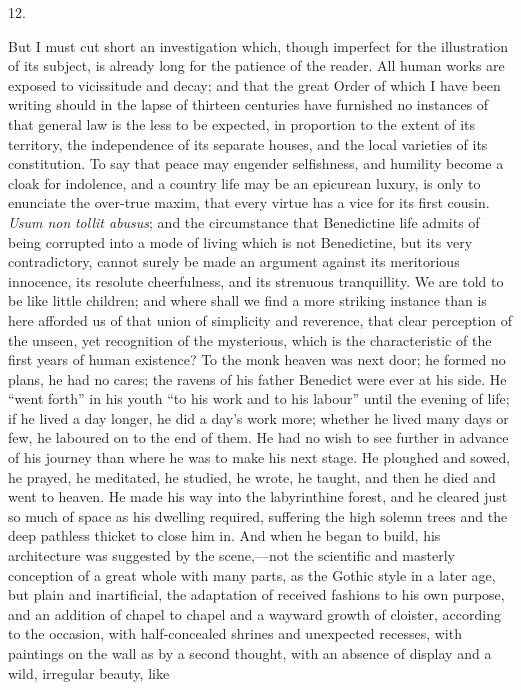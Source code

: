 12.

But I must cut short an investigation which, though imperfect for
the illustration of its subject, is already long for the patience of
the reader. All human works are exposed to vicissitude and decay; and
that the great Order of which I have been writing should in the lapse
of thirteen centuries have furnished no instances of that general law
is the less to be expected, in proportion to the extent of its
territory, the independence of its separate houses, and the local
varieties of its constitution. To say that peace may engender
selfishness, and humility become a cloak for indolence, and a country
life may be an epicurean luxury, is only to enunciate the over-true
maxim, that every virtue has a vice for its first cousin. \emph{Usum non}
\emph{tollit abusus}; and the circumstance that Benedictine life
admits of being corrupted into a mode of living which is not
Benedictine, but its very contradictory, cannot surely be made an
argument against its meritorious innocence, its resolute cheerfulness,
and its strenuous tranquillity. We are told to be like little
children; and where shall we find a more striking instance than is
here afforded us of that union of simplicity and reverence, that clear
perception of the unseen, yet recognition of the mysterious, which is
the characteristic of the first years of human existence? To the monk
heaven was next door; he formed no plans, he had no cares; the
ravens of his father Benedict were ever at his side. He ``went
forth'' in his youth ``to his work and to his labour''
until the evening of life; if he lived a day longer, he did a day's
work more; whether he lived many days or few, he laboured on to the
end of them. He had no wish to see further in advance of his journey
than where he was to make his next stage. He ploughed and sowed, he
prayed, he meditated, he studied, he wrote, he taught, and then he
died and went to heaven. He made his way into the labyrinthine forest,
and he cleared just so much of space as his dwelling required,
suffering the high solemn trees and the deep pathless thicket to close
him in. And when he began to build, his architecture was suggested by
the scene,—not the scientific and masterly conception of a great
whole with many parts, as the Gothic style in a later age, but plain
and inartificial, the adaptation of received fashions to his own
purpose, and an addition of chapel to chapel and a wayward growth of
cloister, according to the occasion, with half-concealed shrines and
unexpected recesses, with paintings on the wall as by a second
thought, with an absence of display and a wild, irregular beauty, like

